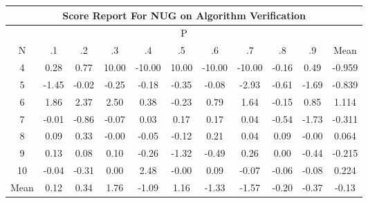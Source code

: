 \documentclass[11pt,a4paper]{report}
\begin{document}
\begin{longtable}{ | c || c | c | c | c | c | c | c | c | c || c |}
\hline
\multicolumn{11}{|c|}{ Score Report For NUG on Algorithm Verification} \\
\hline
\multicolumn{11}{|c|}{ P } \\
\hline
N & .1 & .2 & .3 & .4 & .5 & .6 & .7 & .8 & .9 & Mean\\
 \hline
 \hline
 \endhead
  4 &  \cellcolor[HTML]{F7F7FF} 0.28 &  \cellcolor[HTML]{EFEFFF} 0.77 &  \cellcolor[HTML]{0808FF} 10.00 &  \cellcolor[HTML]{FF0000} -10.00 &  \cellcolor[HTML]{0808FF} 10.00 &  \cellcolor[HTML]{FF0000} -10.00 &  \cellcolor[HTML]{FF0000} -10.00 &  \cellcolor[HTML]{FFF7F7} -0.16 &  \cellcolor[HTML]{EFEFFF} 0.49 & -0.959 \\
  5 &  \cellcolor[HTML]{FFD7D7} -1.45 &  \cellcolor[HTML]{FFFFFF} -0.02 &  \cellcolor[HTML]{FFF7F7} -0.25 &  \cellcolor[HTML]{FFF7F7} -0.18 &  \cellcolor[HTML]{FFF7F7} -0.35 &  \cellcolor[HTML]{FFFFFF} -0.08 &  \cellcolor[HTML]{FFB7B7} -2.93 &  \cellcolor[HTML]{FFEFEF} -0.61 &  \cellcolor[HTML]{FFD7D7} -1.69 & -0.839 \\
  6 &  \cellcolor[HTML]{CFCFFF} 1.86 &  \cellcolor[HTML]{C7C7FF} 2.37 &  \cellcolor[HTML]{BFBFFF} 2.50 &  \cellcolor[HTML]{F7F7FF} 0.38 &  \cellcolor[HTML]{FFF7F7} -0.23 &  \cellcolor[HTML]{EFEFFF} 0.79 &  \cellcolor[HTML]{D7D7FF} 1.64 &  \cellcolor[HTML]{FFFFFF} -0.15 &  \cellcolor[HTML]{E7E7FF} 0.85 & 1.114 \\
  7 &  \cellcolor[HTML]{FFFFFF} -0.01 &  \cellcolor[HTML]{FFE7E7} -0.86 &  \cellcolor[HTML]{FFFFFF} -0.07 &  \cellcolor[HTML]{FFFFFF} 0.03 &  \cellcolor[HTML]{F7F7FF} 0.17 &  \cellcolor[HTML]{F7F7FF} 0.17 &  \cellcolor[HTML]{FFFFFF} 0.04 &  \cellcolor[HTML]{FFEFEF} -0.54 &  \cellcolor[HTML]{FFD7D7} -1.73 & -0.311 \\
  8 &  \cellcolor[HTML]{FFFFFF} 0.09 &  \cellcolor[HTML]{F7F7FF} 0.33 &  \cellcolor[HTML]{FFFFFF} -0.00 &  \cellcolor[HTML]{FFFFFF} -0.05 &  \cellcolor[HTML]{FFFFFF} -0.12 &  \cellcolor[HTML]{F7F7FF} 0.21 &  \cellcolor[HTML]{FFFFFF} 0.04 &  \cellcolor[HTML]{FFFFFF} 0.09 &  \cellcolor[HTML]{FFFFFF} -0.00 & 0.064 \\
  9 &  \cellcolor[HTML]{FFFFFF} 0.13 &  \cellcolor[HTML]{FFFFFF} 0.08 &  \cellcolor[HTML]{FFFFFF} 0.10 &  \cellcolor[HTML]{FFF7F7} -0.26 &  \cellcolor[HTML]{FFDFDF} -1.32 &  \cellcolor[HTML]{FFEFEF} -0.49 &  \cellcolor[HTML]{F7F7FF} 0.26 &  \cellcolor[HTML]{FFFFFF} 0.00 &  \cellcolor[HTML]{FFF7F7} -0.44 & -0.215 \\
  10 &  \cellcolor[HTML]{FFFFFF} -0.04 &  \cellcolor[HTML]{FFF7F7} -0.31 &  \cellcolor[HTML]{FFFFFF} 0.00 &  \cellcolor[HTML]{BFBFFF} 2.48 &  \cellcolor[HTML]{FFFFFF} -0.00 &  \cellcolor[HTML]{FFFFFF} 0.09 &  \cellcolor[HTML]{FFFFFF} -0.07 &  \cellcolor[HTML]{FFFFFF} -0.06 &  \cellcolor[HTML]{FFFFFF} -0.08 & 0.224 \\
 \hline
 \hline
Mean &  \cellcolor[HTML]{FFFFFF} 0.12 &  \cellcolor[HTML]{F7F7FF} 0.34 &  \cellcolor[HTML]{CFCFFF} 1.76 &  \cellcolor[HTML]{FFE7E7} -1.09 &  \cellcolor[HTML]{DFDFFF} 1.16 &  \cellcolor[HTML]{FFDFDF} -1.33 &  \cellcolor[HTML]{FFD7D7} -1.57 &  \cellcolor[HTML]{FFF7F7} -0.20 &  \cellcolor[HTML]{FFF7F7} -0.37 &  \cellcolor[HTML]{FFFFFF} -0.13
\end{longtable}
\end{document}
